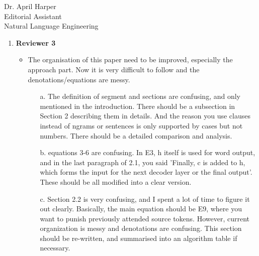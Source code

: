 \documentclass[11pt]{letter} %
\theoremstyle{definition}
\begin{document}
\begin{letter}{Dr. April Harper \\
            Editorial Assistant \\
			Natural Language Engineering}
\begin{enumerate}
\begin{itemize}
                \item What is the computational complexity of the Sentence-level Backtracking Decoder (SBD) and how it related to the complexity of beam search?
                \item[] \textbf{AUTHORS' RESPONSE}: 
                
                \item The paper presents experiments comparing the current model with Transformers (Speed section). Could the authors elaborate more about the complexity of the models? - - How the computational complexity of CNN seq-to-seq is related to Transformers? (e.g. transformers has a complexity of O($n^2$) )
                \item[] \textbf{AUTHORS' RESPONSE}: 
                
                \item One alternative to the SBD would be to learn to avoid similar sentences during training using a modified loss function (e.g. check previous tokens and penalize n-grams during generation modifying the vocabulary probability).
                \item[] \textbf{AUTHORS' RESPONSE}: 

				
			\end{itemize}

			\item \textbf{Reviewer 3}
			\begin{itemize}
			    \item The organisation of this paper need to be improved, especially the approach part. Now it is very difficult to follow and the denotations/equations are messy.
			    \begin{itemize}
			    \item[a.] The definition of segment and sections are confusing, and only mentioned in the introduction. There should be a subsection in Section 2 describing them in details. And the reason you use clauses instead of ngrams or sentences is only supported by cases but not numbers. There should be a detailed comparison and analysis.
			    
			    \item[b.] equations 3-6 are confusing. In E3, h itself is used for word output, and in the last paragraph of 2.1, you said 'Finally, c is added to h, which forms the input for the next decoder layer or the final output'. These should be all modified into a clear version.
			    
			     \item[c.] Section 2.2 is very confusing, and I spent a lot of time to figure it out clearly. Basically, the main equation should be E9, where you want to punish previously attended source tokens. However, current organization is messy and denotations are confusing. This section should be re-written, and summarised into an algorithm table if necessary.
			    

\end{itemize}
\end{itemize}
\end{enumerate}
\end{letter}
\end{document}
